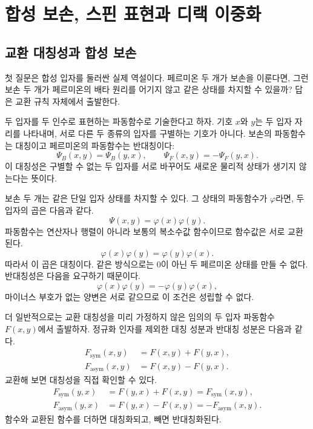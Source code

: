 \chapter{합성 보손, 스핀 표현과 디랙 이중화}

\section{교환 대칭성과 합성 보손}

첫 질문은 합성 입자를 둘러싼 실제 역설이다. 페르미온 두 개가 보손을 이룬다면, 그런 보손 두 개가 페르미온의 배타 원리를 어기지 않고 같은 상태를 차지할 수 있을까? 답은 교환 규칙 자체에서 출발한다.

두 입자를 두 인수로 표현하는 파동함수로 기술한다고 하자. 기호 \(x\)와 \(y\)는 두 입자 자리를 나타내며, 서로 다른 두 종류의 입자를 구별하는 기호가 아니다. 보손의 파동함수는 대칭이고 페르미온의 파동함수는 반대칭이다:
\begin{equation}
\Psi_B(x,y)=\Psi_B(y,x),
\qquad
\Psi_F(x,y)=-\Psi_F(y,x).
\end{equation}
이 대칭성은 구별할 수 없는 두 입자를 서로 바꾸어도 새로운 물리적 상태가 생기지 않는다는 뜻이다.

보손 두 개는 같은 단일 입자 상태를 차지할 수 있다. 그 상태의 파동함수가 \(\varphi\)라면, 두 입자의 곱은 다음과 같다.
\begin{equation}
\Psi(x,y)=\varphi(x)\varphi(y).
\end{equation}
파동함수는 연산자나 행렬이 아니라 보통의 복소수값 함수이므로 함수값은 서로 교환된다.
\begin{equation}
\varphi(x)\varphi(y)=\varphi(y)\varphi(x).
\end{equation}
따라서 이 곱은 대칭이다. 같은 방식으로는 0이 아닌 두 페르미온 상태를 만들 수 없다. 반대칭성은 다음을 요구하기 때문이다.
\begin{equation}
\varphi(x)\varphi(y)=-\varphi(y)\varphi(x),
\end{equation}
마이너스 부호가 없는 양변은 서로 같으므로 이 조건은 성립할 수 없다.

더 일반적으로는 교환 대칭성을 미리 가정하지 않은 임의의 두 입자 파동함수 \(F(x,y)\)에서 출발하자. 정규화 인자를 제외한 대칭 성분과 반대칭 성분은 다음과 같다.
\begin{align}
F_{\mathrm{sym}}(x,y)&=F(x,y)+F(y,x),\\
F_{\mathrm{asym}}(x,y)&=F(x,y)-F(y,x).
\end{align}
교환해 보면 대칭성을 직접 확인할 수 있다.
\begin{align}
F_{\mathrm{sym}}(y,x)
&=F(y,x)+F(x,y)
=F_{\mathrm{sym}}(x,y),\\
F_{\mathrm{asym}}(y,x)
&=F(y,x)-F(x,y)
=-F_{\mathrm{asym}}(x,y).
\end{align}
함수와 교환된 함수를 더하면 대칭화되고, 빼면 반대칭화된다.

